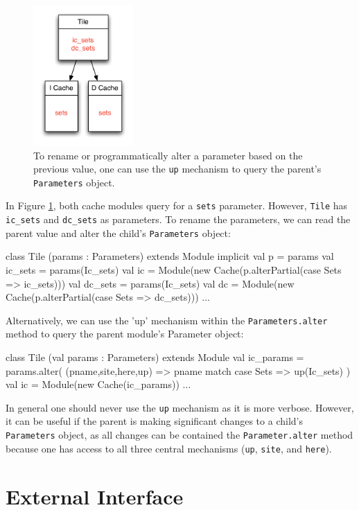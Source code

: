\documentclass[10pt,twocolumn]{article}
\def\code#1{{\small\tt #1}}
\begin{document}
\begin{figure}[h]
\centering
\includegraphics[width=1.5in]{figs/ex6.pdf}
\caption{To rename or programmatically alter a parameter based on the previous value, one can use the \code{up} mechanism to query the parent's \code{Parameters} object.}
\label{fig:ex6}
\end{figure}

In Figure \ref{fig:ex6}, both cache modules query for a \code{sets} parameter. However, \code{Tile} has \code{ic\_sets} and \code{dc\_sets} as parameters. To rename the parameters, we can read the parent value and alter the child's \code{Parameters} object:

\begin{scala}
class Tile (params : Parameters) extends Module {
  implicit val p = params
  val ic_sets = params(Ic_sets)
  val ic = Module(new Cache(p.alterPartial({case Sets => ic_sets})))
  val dc_sets = params(Ic_sets)
  val dc = Module(new Cache(p.alterPartial({case Sets => dc_sets})))
    ...
}
\end{scala}
Alternatively, we can use the 'up' mechanism within the
\code{Parameters.alter} method to query the parent module's Parameter object:
\begin{scala}
class Tile (val params : Parameters) extends Module {
  val ic_params = params.alter(
    (pname,site,here,up) => pname match {
      case Sets => up(Ic_sets)
    }
  )
  val ic = Module(new Cache(ic_params))
  ...
}
\end{scala}
In general one should never use the \code{up} mechanism as it is more verbose. However, it can be useful if the parent is making significant changes to a child's \code{Parameters} object, as all changes can be contained the \code{Parameter.alter} method because one has access to all three central mechanisms (\code{up}, \code{site}, and \code{here}).

\section{External Interface}
\label{sec:knobs}
\end{document}
